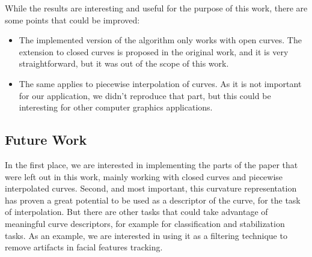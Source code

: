 \documentclass{ipol}
\begin{document}
While the results are interesting and useful for the purpose of this work, there are some points that could be improved:
\begin{itemize}
	\item The implemented version of the algorithm only works with open curves. The extension to closed curves is proposed in the original work, and it is very straightforward, but it was out of the scope of this work. 
	\item The same applies to piecewise interpolation of curves. As it is not important for our application, we didn't reproduce that part, but this could be interesting for other computer graphics applications.
\end{itemize}

\subsection{Future Work}

In the first place, we are interested in implementing the parts of the paper that were left out in this work, mainly working with closed curves and piecewise interpolated curves.
Second, and most important, this curvature representation has proven a great potential to be used as a descriptor of the curve, for the task of interpolation. But there are other tasks that could take advantage of meaningful curve descriptors, for example for classification and stabilization tasks. As an example, we are interested in using it as a filtering technique to remove artifacts in facial features tracking.
\clearpage

\clearpage

\clearpage


\end{document}
